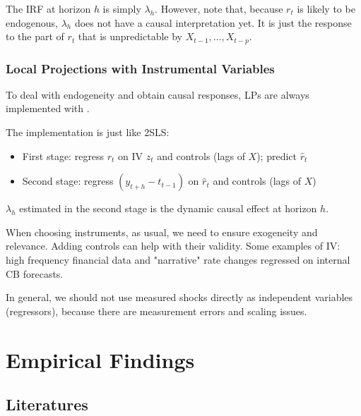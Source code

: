                 The IRF at horizon $h$ is simply $\lambda_h$. However, note that, because $r_t$ is likely to be endogenous, $\lambda_h$ does not have a causal interpretation yet. It is just the response to the part of $r_t$ that is unpredictable by $X_{t-1}, \dots, X_{t-p}$.

            \subsubsection{Local Projections with Instrumental Variables}
            
                To deal with endogeneity and obtain causal responses, LPs are always implemented with .

                The implementation is just like 2SLS:
                \begin{itemize}
                    \item First stage: regress $r_t$ on IV $z_t$ and controls (lags of $X$); predict $\hat{r}_t$
                    \item Second stage: regress $(y_{t+h}-t_{t-1})$ on $\hat{r}_t$ and controls (lags of $X$)
                \end{itemize}
                $\lambda_h$ estimated in the second stage is the dynamic causal effect at horizon $h$.

                When choosing instruments, as usual, we need to ensure exogeneity and relevance. Adding controls can help with their validity. Some examples of IV: high frequency financial data and "narrative" rate changes regressed on internal CB forecasts.

                In general, we should not use measured shocks directly as independent variables (regressors), because there are measurement errors and scaling issues.

    \section{Empirical Findings}

        \subsection{Literatures}

